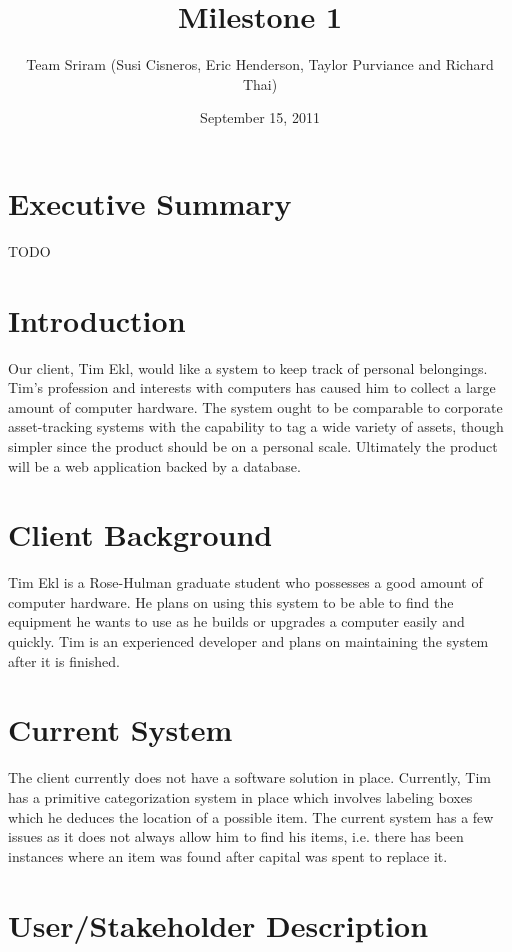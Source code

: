 \documentclass{article}
\begin{document}
\setlength{\voffset}{3.5in}
\title{Milestone 1}
\author{Team Sriram (Susi Cisneros, Eric Henderson, Taylor Purviance and Richard Thai)}
\date{September 15, 2011}
\maketitle
\clearpage
\setlength{\voffset}{0pt}
\tableofcontents
\clearpage
\section{Executive Summary}
TODO

\section{Introduction}
Our client, Tim Ekl, would like a system to keep track of personal belongings. Tim’s profession and interests with computers has caused him to collect a large amount of computer hardware. The system ought to be comparable to corporate asset-tracking systems with the capability to tag a wide variety of assets, though simpler since the product should be on a personal scale. Ultimately the product will be a web application backed by a database.

\section{Client Background}
Tim Ekl is a Rose-Hulman graduate student who possesses a good amount of computer hardware.  He plans on using this system to be able to find the equipment he wants to use as he builds or upgrades a computer easily and quickly.  Tim is an experienced developer and plans on maintaining the system after it is finished.  

\section{Current System}
The client currently does not have a software solution in place.  Currently, Tim has a primitive categorization system in place which involves labeling boxes which he deduces the location of a possible item.  The current system has a few issues as it does not always allow him to find his items, i.e. there has been instances where an item was found after capital was spent to replace it.

\section{User/Stakeholder Description}
\end{document}
